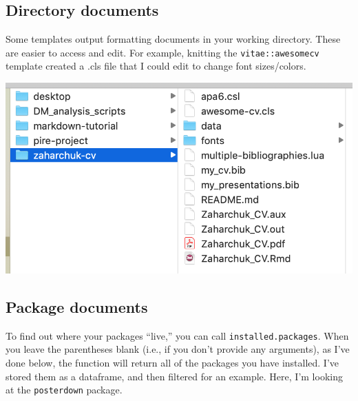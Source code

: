 \documentclass[
  openany]{book}
\newenvironment{Shaded}{\begin{snugshade}}{\end{snugshade}}
\newcommand{\CommentTok}[1]{\textcolor[rgb]{0.56,0.35,0.01}{\textit{#1}}}
\newcommand{\DataTypeTok}[1]{\textcolor[rgb]{0.13,0.29,0.53}{#1}}
\newcommand{\DecValTok}[1]{\textcolor[rgb]{0.00,0.00,0.81}{#1}}
\newcommand{\KeywordTok}[1]{\textcolor[rgb]{0.13,0.29,0.53}{\textbf{#1}}}
\newcommand{\NormalTok}[1]{#1}
\newcommand{\OperatorTok}[1]{\textcolor[rgb]{0.81,0.36,0.00}{\textbf{#1}}}
\newcommand{\OtherTok}[1]{\textcolor[rgb]{0.56,0.35,0.01}{#1}}
\newcommand{\StringTok}[1]{\textcolor[rgb]{0.31,0.60,0.02}{#1}}
\begin{document}
\hypertarget{clsex}{%
\subsection{Directory documents}\label{clsex}}

Some templates output formatting documents in your working directory. These are easier to access and edit. For example, knitting the \texttt{vitae::awesomecv} template created a .cls file that I could edit to change font sizes/colors.

\includegraphics[width=\textwidth]{images/template_dir}

\hypertarget{package-documents}{%
\subsection{Package documents}\label{package-documents}}

To find out where your packages ``live,'' you can call \texttt{installed.packages}. When you leave the parentheses blank (i.e., if you don't provide any arguments), as I've done below, the function will return all of the packages you have installed. I've stored them as a dataframe, and then filtered for an example. Here, I'm looking at the \texttt{posterdown} package.

\begin{Shaded}
\end{Shaded}
\end{document}
